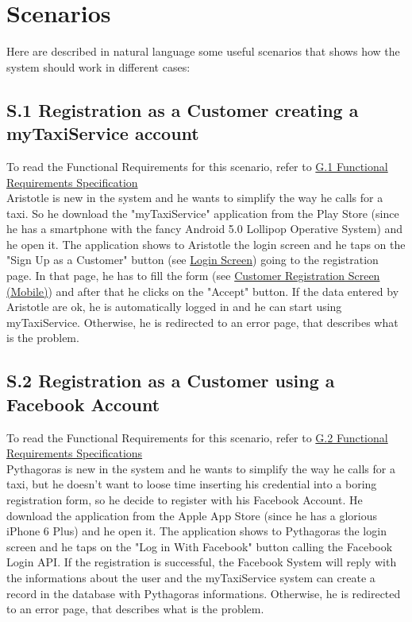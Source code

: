 \section{Scenarios}
	Here are described in natural language some useful scenarios that shows how the system should work in different cases:

		\subsection{S.1 Registration as a Customer creating a myTaxiService account}\label{sec:NormalCustomerRegistrationScenario}
		To read the Functional Requirements for this scenario, refer to \hyperref[sec:frs1]{G.1 Functional Requirements Specification}\\

		Aristotle is new in the system and he wants to simplify the way he calls for a taxi. So he download the "myTaxiService" application from the Play Store (since he has a smartphone with the fancy Android 5.0 Lollipop Operative System) and he open it.
		The application shows to Aristotle the login screen and he taps on the "Sign Up as a Customer" button (see \hyperref[login_m]{Login Screen}) going to the registration page. In that page, he has to fill the form (see \hyperref[cregistration_m]{Customer Registration Screen (Mobile)}) and after that he clicks on the "Accept" button. If the data entered by Aristotle are ok, he is automatically logged in and he can start using myTaxiService. Otherwise, he is redirected to an error page, that describes what is the problem. 

		\subsection{S.2 Registration as a Customer using a Facebook Account}\label{sec:FacebookCustomerRegistrationScenario}
		To read the Functional Requirements for this scenario, refer to \hyperref[sec:frs2]{G.2 Functional Requirements Specifications}\\

		Pythagoras is new in the system and he wants to simplify the way he calls for a taxi, but he doesn't want to loose time inserting his credential into a boring registration form, so he decide to register with his Facebook Account.
		He download the application from the Apple App Store (since he has a glorious iPhone 6 Plus) and he open it.
		The application shows to Pythagoras the login screen and he taps on the "Log in With Facebook" button calling the Facebook Login API.
		If the registration is successful, the Facebook System will reply with the informations about the user and the myTaxiService system can create a record in the database with Pythagoras informations. Otherwise, he is redirected to an error page, that describes what is the problem.

